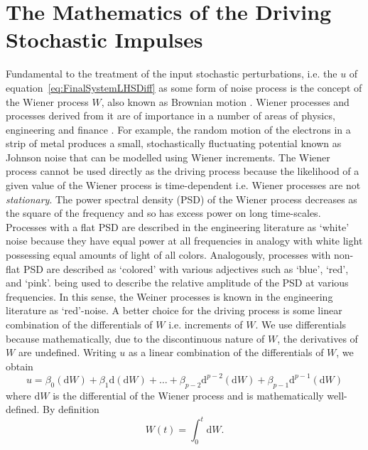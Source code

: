 \documentclass[a4paper,fleqn,usenatbib]{mnras}
\begin{document}
\section[Stochastic Impulses Mathematics]{The Mathematics of the Driving Stochastic Impulses}\label{sec:RHS}

Fundamental to the treatment of the input stochastic perturbations, i.e. the $u$ of equation~\eqref{eq:FinalSystemLHSDiff} as some form of noise process is the concept of the Wiener process $W$, also known as Brownian motion \citep{Doob,Davis,Jacobs,Oksendal}. Wiener processes and processes derived from it are of importance in a number of areas of physics, engineering and finance \citep{Jacobs}. For example, the random motion of the electrons in a strip of metal produces a small, stochastically fluctuating potential known as Johnson noise \citep{Gillespie96} that can be modelled using Wiener increments. The Wiener process cannot be used directly as the driving process because the likelihood of a given value of the Wiener process is time-dependent i.e. Wiener processes are not \textit{stationary}. The power spectral density (PSD) of the Wiener process decreases as the square of the frequency and so has excess power on long time-scales. Processes with a flat PSD are described in the engineering literature as `white' noise because they have equal power at all frequencies in analogy with white light possessing equal amounts of light of all colors. Analogously, processes with non-flat PSD are described as `colored' with various adjectives such as `blue', `red', and `pink'. being used to describe the relative amplitude of the PSD at various frequencies. In this sense, the Weiner processes is known in the engineering literature as `red'-noise. A better choice for the driving process is some linear combination of the differentials of $W$ i.e. increments of $W$. We use differentials because mathematically, due to the discontinuous nature of $W$, the derivatives of $W$ are undefined. Writing $u$ as a linear combination of the differentials of $W$, we obtain   
\begin{equation}\label{eq:FinalSystemRHSDiff}
u = \beta_{0} (\mathrm{d}W) + \beta_{1} \mathrm{d}(\mathrm{d}W) + \ldots + \beta_{p-2} \mathrm{d}^{p-2}(\mathrm{d}W) + \beta_{p-1} \mathrm{d}^{p-1}(\mathrm{d}W)
\end{equation}
where $\mathrm{d}W$ is the differential of the Wiener process and is mathematically well-defined. By definition
\begin{equation}\label{eq:WienerIncr}
W(t) = \int_{0}^{t} \mathrm{d}W.
\end{equation}
\end{document}
